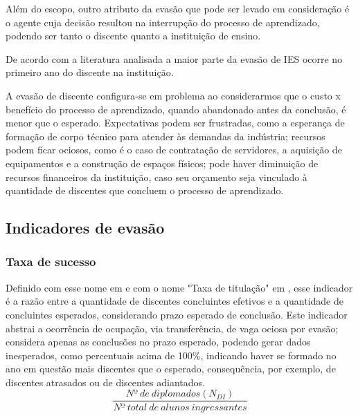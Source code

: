 \documentclass{report}
\begin{document}
Além do escopo, outro atributo da evasão que pode ser levado em consideração é o agente cuja decisão resultou na interrupção do processo de aprendizado, podendo ser tanto o discente quanto a instituição de ensino.


De acordo com a literatura analisada \cite{tinto_leaving} \cite{evasao_panorama} a maior parte da evasão de IES ocorre no primeiro ano do discente na instituição.

A evasão de discente configura-se em problema ao considerarmos que o custo x benefício do processo de aprendizado, quando abandonado antes da conclusão, é menor que o esperado. Expectativas podem ser frustradas, como a esperança de formação de corpo técnico para atender às demandas da indústria; recursos podem ficar ociosos, como é o caso de contratação de servidores, a aquisição de equipamentos e a construção de espaços físicos; pode haver diminuição de recursos financeiros da instituição, caso seu orçamento seja vinculado à quantidade de discentes que concluem o processo de aprendizado. 

\subsection{Indicadores de evasão}

\subsubsection{Taxa de sucesso}

Definido com esse nome em \cite{indicadores_TCU} e com o nome "Taxa de titulação" em \cite{mudanca_calculos}, esse indicador é a razão entre a quantidade de discentes concluintes efetivos e a quantidade de concluintes esperados, considerando prazo esperado de conclusão.
Este indicador abstrai a ocorrência de ocupação, via transferência, de vaga ociosa por evasão; considera apenas as conclusões no prazo esperado, podendo gerar dados inesperados, como percentuais acima de 100\%, indicando haver se formado no ano em questão mais discentes que o esperado, consequência, por exemplo, de discentes atrasados ou de discentes adiantados.
\begin{equation}
\frac{Nº\ de\ diplomados(N_{DI})}{Nº\ total\ de\ alunos\ ingressantes}
\end{equation}

\end{document}
